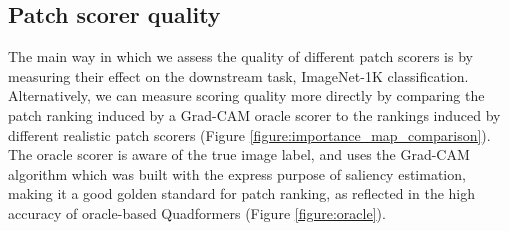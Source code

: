 \begin{table}[t!]
\centering
{}%
\caption{Forward pass cost breakdown. Measuring actual runtime is especially important for comparison between Quadformers and vanilla ViTs since different components have very different runtime-to-GMACs ratios.}
\label{table:cost_breakdown}
\end{table}


\subsection{Patch scorer quality}
The main way in which we assess the quality of different patch scorers is by measuring their effect on the downstream task, ImageNet-1K classification. Alternatively, we can measure scoring quality more directly by comparing the patch ranking induced by a Grad-CAM oracle scorer to the rankings induced by different realistic patch scorers (Figure \ref{figure:importance_map_comparison}). The oracle scorer is aware of the true image label, and uses the Grad-CAM algorithm which was built with the express purpose of saliency estimation, making it a good golden standard for patch ranking, as reflected in the high accuracy of oracle-based Quadformers (Figure \ref{figure:oracle}).

